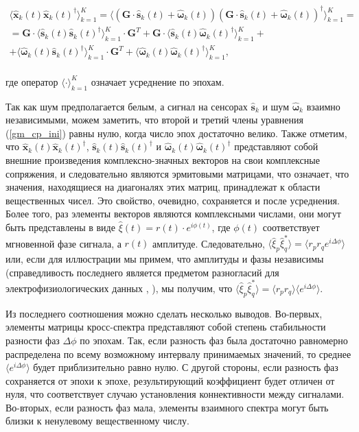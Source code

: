\begin{gather}
           \langle{\hat{\mathbf{x}}_k(t) \hat{\mathbf{x}}_k(t)^{\dag}} \rangle_{k=1}^K =
           \langle{(\mathbf{G} \cdot\hat{\mathbf{s}}_k(t) + \hat{\mathbf{\omega}}_k(t))
                                       (\mathbf{G} \cdot\hat{\mathbf{s}}_k(t) + \hat{\mathbf{\omega}}_k(t))^{\dag}}\rangle_{k=1}^K=\nonumber\\
= \mathbf{G}  \cdot \langle{\hat{\mathbf{s     }}_k(t) \hat{\mathbf{s     }}_k(t)^{\dag}} \rangle_{k=1}^K \cdot \mathbf{G}^T +
   \mathbf{G} \cdot \langle{\hat{\mathbf{s     }}_k(t) \hat{\mathbf{\omega}}_k(t)^{\dag}} \rangle_{k=1}^K + \nonumber\\
        +  \langle{\hat{\mathbf{\omega}}_k(t) \hat{\mathbf{s     }}_k(t)^{\dag}} \rangle_{k=1}^K \cdot \mathbf{G}^T +
           \langle{\hat{\mathbf{\omega}}_k(t) \hat{\mathbf{\omega}}_k(t)^{\dag}} \rangle_{k=1}^K,
    \label{gm_cp_ini}
\end{gather}
\\
где оператор $\langle \cdot \rangle_{k=1}^K$ означает усреднение по эпохам.

Так как шум предполагается белым, а сигнал на сенсорах $\hat{\mathbf{s}}_k$ и шум $\hat{\mathbf{\omega}}_k$ взаимно независимыми,
можем заметить, что второй и третий члены уравнения (\ref{gm_cp_ini}) равны нулю, когда число эпох достаточно велико.
Также отметим, что
$\hat{\mathbf{x     }}_k(t) \hat{\mathbf{x     }}_k(t)^{\dag}$,
$\hat{\mathbf{s     }}_k(t) \hat{\mathbf{s     }}_k(t)^{\dag}$ и
$\hat{\mathbf{\omega}}_k(t) \hat{\mathbf{\omega}}_k(t)^{\dag}$
представляют собой внешние произведения комплексно-значных векторов на свои комплексные сопряжения,
и следовательно являются эрмитовыми матрицами, что означает,
что значения, находящиеся на диагоналях этих матриц, принадлежат к области вещественных чисел.
Это свойство, очевидно, сохраняется и после усреднения.
Более того, раз элементы векторов являются комплексными числами, они могут быть представлены в виде
$\hat{\xi}(t) = r(t)\cdot e^{i\phi(t)}$, где $\phi(t)$ соответствует мгновенной фазе сигнала,
а $r(t)$ амплитуде. Следовательно,
$\langle \hat{\xi}_p \hat{\xi}_q^* \rangle = \langle r_p r_q e^{i\Delta\phi} \rangle$ или,
если для иллюстрации мы примем, что амплитуды и фазы независимы
(справедливость последнего является предметом разногласий для электрофизиологических данных \cite{Lachaux1999}, \cite{imcoh}),
мы получим, что
$\langle \hat{\xi}_p \hat{\xi}_q^* \rangle = \langle r_p r_q \rangle \langle e^{i\Delta\phi} \rangle$.

Из последнего соотношения можно сделать несколько выводов.
Во-первых, элементы матрицы кросс-спектра представляют собой степень стабильности
разности фаз $\Delta\phi$ по эпохам.
Так, если разность фаз была достаточно равномерно распределена по всему возможному
интервалу принимаемых значений, то среднее $\langle e^{i\Delta\phi} \rangle$
будет приблизительно равно нулю.
С другой стороны, если разность фаз сохраняется от эпохи к эпохе,
результирующий коэффициент будет отличен от нуля,
что соответствует случаю установления коннективности между сигналами.
Во-вторых, если разность фаз мала,
элементы взаимного спектра могут быть близки к ненулевому вещественному числу.

